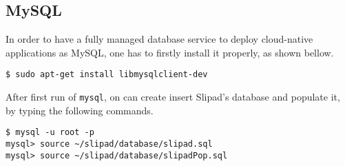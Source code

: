 \subsection{MySQL}
In order to have a fully managed database service to deploy cloud-native applications as MySQL, one has to firstly install it properly, as shown bellow.

\begin{lstlisting}
$ sudo apt-get install libmysqlclient-dev
\end{lstlisting}

After first run of \verb|mysql|, on can create insert Slipad's database and populate it, by typing the following commands.
\begin{lstlisting}
$ mysql -u root -p
mysql> source ~/slipad/database/slipad.sql
mysql> source ~/slipad/database/slipadPop.sql
\end{lstlisting}



